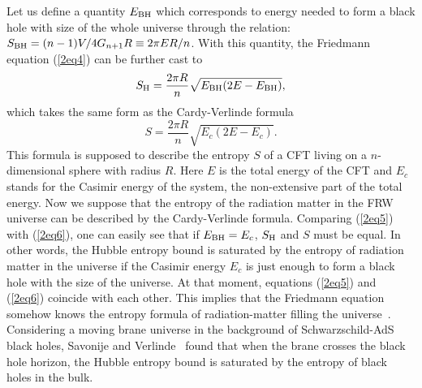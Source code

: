 \documentclass[a4paper,12pt]{article}
\begin{document}
Let us  define a quantity $E_{\rm BH}$ which corresponds to energy
needed to form a black hole with size of the whole universe
through the relation: $ S_{\rm BH}=(n-1)V/4G_{n+1}R \equiv 2\pi E
R/n $. With this quantity, the Friedmann equation (\ref{2eq4}) can
be further cast to
\begin{equation}
\label{2eq5}
 S_{\rm H}=\frac{2\pi R}{n}\sqrt{E_{\rm BH}(2E-E_{\rm BH})},
\end{equation}
which takes the same form as the Cardy-Verlinde formula~\cite{Verl}
\begin{equation}
\label{2eq6}
  S=\frac{2\pi R}{n}\sqrt{E_c(2E-E_c)}.
\end{equation}
This formula is supposed to describe the entropy $S$ of a CFT
living on a $n$-dimensional sphere with radius $R$. Here $E$ is
the total energy of the CFT and $E_c$ stands for the Casimir
energy of the system, the non-extensive part of the total energy.
Now we suppose that the entropy of the radiation matter in the FRW
universe can be described by the Cardy-Verlinde formula. Comparing
(\ref{2eq5}) with (\ref{2eq6}), one can easily see that if
$E_{\rm BH}=E_c$, $S_{\rm H}$ and $S$ must be equal. In other
words, the Hubble entropy bound is saturated by the entropy
of radiation matter in the universe if the Casimir energy $E_c$ is
just enough to form a black hole with the size of the universe.
At that moment, equations (\ref{2eq5}) and (\ref{2eq6}) coincide with
each other.  This implies that the Friedmann equation
somehow knows the entropy formula of radiation-matter filling the
universe~\cite{Verl}. Considering a moving brane universe in the
background of Schwarzschild-AdS black holes, Savonije and
Verlinde~\cite{SV} found that when the brane crosses the black
hole horizon, the Hubble entropy bound is saturated by the entropy of
black holes in the bulk.
\end{document}
